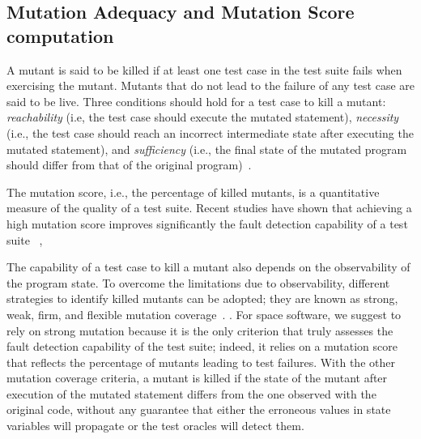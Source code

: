 \subsection{Mutation Adequacy and Mutation Score computation}
\label{background:adequacy}
A mutant is said to be killed if at least one test case in the test suite fails when exercising the mutant.
Mutants that do not lead to the failure of any test case are said to be live.
Three conditions should hold for a test case to kill a mutant: \emph{reachability} (i.e, the test case should execute the mutated statement), \emph{necessity} (i.e., the test case should reach an incorrect intermediate state after executing the mutated statement), and \emph{sufficiency} (i.e., the final state of the mutated program should differ from that of the original program)~\cite{offutt1997automatically}.

The mutation score, i.e., the percentage of killed mutants, is a quantitative measure of the quality of a test suite. Recent studies have shown that achieving a high mutation score improves significantly the fault detection capability of a test suite
~\cite{papadakis2018mutation},  
 

The capability of a test case to kill a mutant also depends on the observability of the program state. To overcome the limitations due to observability, different strategies to identify killed mutants can be adopted; they are known as strong, weak, firm, and flexible mutation coverage~\cite{ammann2016introduction}. 
.
For space software, we suggest to rely on strong mutation because it is the only criterion that truly assesses the fault detection capability of the test suite; indeed, it relies on a mutation score that reflects the percentage of mutants leading to test failures. With the other mutation coverage criteria, a mutant is killed if the state of the mutant after  execution of the mutated statement differs from the one observed with the original code, without any guarantee that either the erroneous values in state variables will propagate or the test oracles will detect them. 




